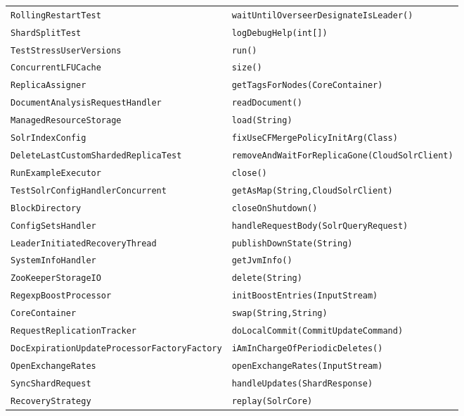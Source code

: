 \begin{center}
\begin{longtable}{ll}
 \lstinline/RollingRestartTest/&{\lstinline/waitUntilOverseerDesignateIsLeader()/}\\
 \lstinline/ShardSplitTest/&{\lstinline/logDebugHelp(int[])/}\\
 \lstinline/TestStressUserVersions/&{\lstinline/run()/}\\
 \lstinline/ConcurrentLFUCache/&{\lstinline/size()/}\\
 \lstinline/ReplicaAssigner/&{\lstinline/getTagsForNodes(CoreContainer)/}\\
 \lstinline/DocumentAnalysisRequestHandler/&{\lstinline/readDocument()/}\\
 \lstinline/ManagedResourceStorage/&{\lstinline/load(String)/}\\
 \lstinline/SolrIndexConfig/&{\lstinline/fixUseCFMergePolicyInitArg(Class)/}\\
 \lstinline/DeleteLastCustomShardedReplicaTest/&{\lstinline/removeAndWaitForReplicaGone(CloudSolrClient)/}\\
 \lstinline/RunExampleExecutor/&{\lstinline/close()/}\\
 \lstinline/TestSolrConfigHandlerConcurrent/&{\lstinline/getAsMap(String,CloudSolrClient)/}\\
 \lstinline/BlockDirectory/&{\lstinline/closeOnShutdown()/}\\
 \lstinline/ConfigSetsHandler/&{\lstinline/handleRequestBody(SolrQueryRequest)/}\\
 \lstinline/LeaderInitiatedRecoveryThread/&{\lstinline/publishDownState(String)/}\\
 \lstinline/SystemInfoHandler/&{\lstinline/getJvmInfo()/}\\
 \lstinline/ZooKeeperStorageIO/&{\lstinline/delete(String)/}\\
 \lstinline/RegexpBoostProcessor/&{\lstinline/initBoostEntries(InputStream)/}\\
 \lstinline/CoreContainer/&{\lstinline/swap(String,String)/}\\
 \lstinline/RequestReplicationTracker/&{\lstinline/doLocalCommit(CommitUpdateCommand)/}\\
 \lstinline/DocExpirationUpdateProcessorFactoryFactory/&{\lstinline/iAmInChargeOfPeriodicDeletes()/}\\
 \lstinline/OpenExchangeRates/&{\lstinline/openExchangeRates(InputStream)/}\\
 \lstinline/SyncShardRequest/&{\lstinline/handleUpdates(ShardResponse)/}\\
 \lstinline/RecoveryStrategy/&{\lstinline/replay(SolrCore)/}\\

\end{longtable}
\end{center}
